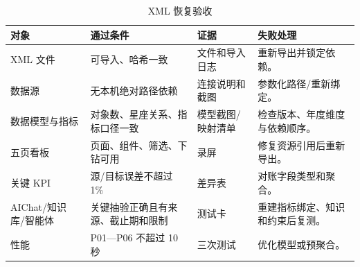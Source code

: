 \documentclass[UTF8,fontset=windows,12pt,openany]{ctexbook}
\begin{document}
\begin{longtable}{p{3.6cm}p{3.3cm}p{3.3cm}p{3.4cm}}
\caption{XML 恢复验收}\label{tab:xml-recovery}\\
\toprule
\textbf{对象} & \textbf{通过条件} & \textbf{证据} & \textbf{失败处理}\\
\midrule
XML 文件 & 可导入、哈希一致 & 文件和导入日志 & 重新导出并锁定依赖。\\
数据源 & 无本机绝对路径依赖 & 连接说明和截图 & 参数化路径/重新绑定。\\
数据模型与指标 & 对象数、星座关系、指标口径一致 & 模型截图/映射清单 & 检查版本、年度维度与依赖顺序。\\
五页看板 & 页面、组件、筛选、下钻可用 & 录屏 & 修复资源引用后重新导出。\\
关键 KPI & 源/目标误差不超过 1\% & 差异表 & 对账字段类型和聚合。\\
AIChat/知识库/智能体 & 关键抽验正确且有来源、截止期和限制 & 测试卡 & 重建指标绑定、知识和约束后复测。\\
性能 & P01—P06 不超过 10 秒 & 三次测试 & 优化模型或预聚合。\\
\bottomrule
\end{longtable}
\end{document}
